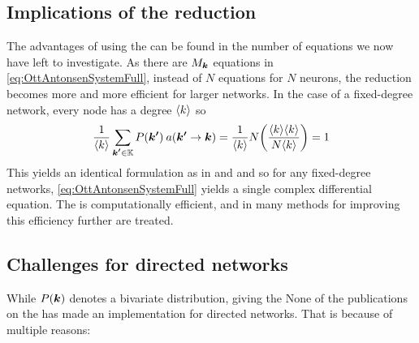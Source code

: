 \subsection{Implications of the reduction}
The advantages of using the \MFR can be found in the number of equations we now have left to investigate. As there are $M_{{\boldsymbol{k}}}$ equations in \eqref{eq:OttAntonsenSystemFull}, instead of $N$ equations for $N$ neurons, the reduction becomes more and more efficient for larger networks. In the case of a fixed-degree network, every node has a degree ${\langle k\rangle}$ so 
\begin{align*}
    \frac{1}{\kmean} \sum_{\kacc \in \K} P\left(\kacc\right) \: a\left(\kacc \rightarrow \k\right) = \frac{1}{\kmean} N \left( \frac{\kmean \kmean}{N \kmean} \right) = 1
\end{align*}
This yields an identical formulation as in \cite{Luke2013} and \cite{Martens2020} and so for any fixed-degree networks, \eqref{eq:OttAntonsenSystemFull} yields a single complex differential equation. The \MFR is computationally efficient, and in \cite{OttAntonsen2017} many methods for improving this efficiency further are treated.

\subsection{Challenges for directed networks}
While $P({\boldsymbol{k}})$ denotes a bivariate distribution, giving the 
None of the publications on the \MFR has made an implementation for directed networks. That is because of multiple reasons:


